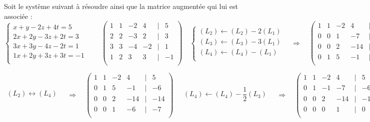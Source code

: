 \begin{exemple}
\footnotesize
Soit le système suivant à résoudre ainsi que la matrice augmentée qui lui est associée : 
$$
\left\{
\begin{array}{l}
x   + y  -2 z +4t = 5 \\
2x + 2y -3 z +2t = 3 \\
3x + 3y -4 z -2t = 1 \\
1x + 2y +3 z +3t = -1 \\
\end{array}
\right.
\quad\quad
\begin{pmatrix}
1 & 1 & -2 & 4 & | & 5 \\
2 & 2 & -3 & 2 & | &  3 \\
3 & 3 & -4 &  -2& | & 1 \\
1 & 2 & 3 & 3 & | & -1 \\
\end{pmatrix}
\quad \left\{
\begin{array}{l}
(L_2) \leftarrow (L_2) - 2 (L_1) \\ 
(L_3) \leftarrow (L_3) - 3 (L_1) \\
(L_4) \leftarrow (L_4) -  (L_1) \\
\end{array}
\right.
\quad\Longrightarrow \quad
\begin{pmatrix}
1 & 1 & -2 & 4 & | & 5 \\
0 & 0 & 1 & -7 & | &  -6 \\
0 & 0 & 2 &  -14& | & -14 \\
0 & 1 & 5 & -1 & | & -6 \\
\end{pmatrix}
$$


$$
\begin{array}{l}
(L_2) \leftrightarrow (L_4)  \\ 
\end{array}
\quad\Longrightarrow \quad
\begin{pmatrix}
1 & 1 & -2 & 4 & | & 5 \\
0 & 1 & 5 & -1 & | & -6 \\
0 & 0 & 2 &  -14& | & -14 \\
0 & 0 & 1 & -6 & | &  -7 \\
\end{pmatrix}
%
\quad
\begin{array}{l}
(L_4) \leftarrow (L_4) - \dfrac{1}{2} (L_3)\\ 
\end{array}
\quad\Longrightarrow \quad
\begin{pmatrix}
1 & 1 & -2 & 4 & | & 5 \\
0 & 1 & -1 & -7 & | & -6 \\
0 & 0 & 2 &  -14& | & -14 \\
0 & 0 & 0 & 1 & | &  0 \\
\end{pmatrix}
$$
\normalsize

\end{exemple}


